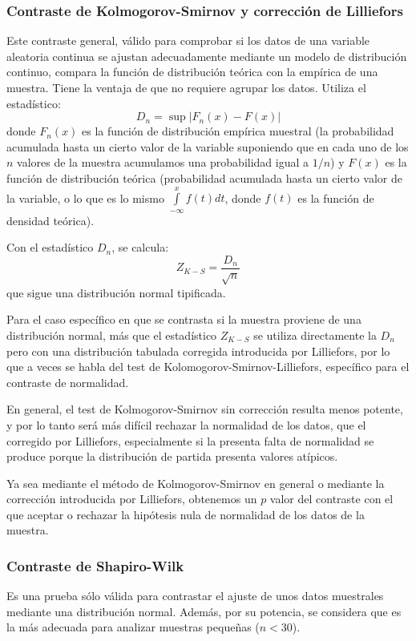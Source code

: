 \subsubsection{Contraste de Kolmogorov-Smirnov y corrección de Lilliefors}
Este contraste general, válido para comprobar si los datos de una variable aleatoria continua se ajustan adecuadamente mediante un modelo de
distribución continuo, compara la función de distribución teórica con la empírica de una muestra. Tiene la ventaja de que no requiere
agrupar los datos. Utiliza el estadístico:
\[
D_n  = \sup \left| {F_n (x) - F(x)} \right|
\]
donde $F_n (x)$ es la función de distribución empírica muestral (la probabilidad acumulada hasta un cierto valor de la variable suponiendo
que en cada uno de los $n$ valores de la muestra acumulamos una probabilidad igual a $1/n$) y $F(x)$ es la función de distribución teórica
(probabilidad acumulada hasta un cierto valor de la variable, o lo que es lo mismo $\int\limits_{ - \infty }^x {f(t)dt}$, donde $f(t)$ es la
función de densidad teórica).

Con el estadístico $D_n$, se calcula:
\[
Z_{K - S}  = \frac{{D_n }}{{\sqrt n }}
\]
que sigue una distribución normal tipificada.

Para el caso específico en que se contrasta si la muestra proviene de una distribución normal, más que el estadístico $Z_{K-S}$ se utiliza
directamente la $D_n$ pero con una distribución tabulada corregida introducida por Lilliefors, por lo que a veces se habla del test de
Kolomogorov-Smirnov-Lilliefors, específico para el contraste de normalidad.

En general, el test de Kolmogorov-Smirnov sin corrección resulta menos potente, y por lo tanto será más difícil rechazar la normalidad de
los datos, que el corregido por Lilliefors, especialmente si la presenta falta de normalidad se produce porque la distribución de partida
presenta valores atípicos.

Ya sea mediante el método de Kolmogorov-Smirnov en general o mediante la corrección introducida por Lilliefors, obtenemos un $p$ valor del
contraste con el que aceptar o rechazar la hipótesis nula de normalidad de los datos de la muestra.

\subsubsection{Contraste de Shapiro-Wilk}
Es una prueba sólo válida para contrastar el ajuste de unos datos muestrales mediante una distribución normal. Además, por su potencia, se
considera que es la más adecuada para analizar muestras pequeñas ($n<30$).


